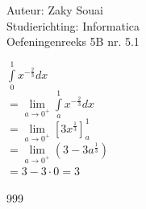 \documentclass[a4paper]{article}
\begin{document}
  
\noindent \large Auteur: Zaky Souai \\
\noindent \large Studierichting:  Informatica\\
\noindent \large Oefeningenreeks 5B nr. 5.1\\

\bigskip

\normalsize

$ \displaystyle\int \limits_{0}^{1} x^{-\tfrac{2}{3}} dx $\\

$ = \lim\limits_{a \to 0^+} \displaystyle \int \limits_{a}^{1} x^{-\tfrac{2}{3}} dx $\\

$ = \lim\limits_{a \to 0^+}\left[3x^{\tfrac{1}{3}}\right]_{a}^{1} $\\

$ =\lim\limits_{a \to 0^+}\left(3 - 3a^{\tfrac{1}{3}}\right) $\\

$ = 3 - 3 \cdot 0 = 3$\\

\begin{thebibliography}{999}
\end{thebibliography}
\end{document}
